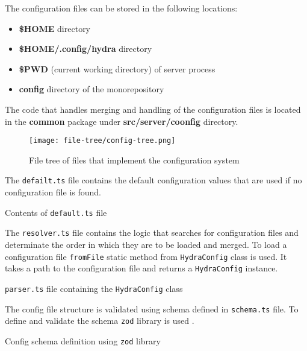 \documentclass[../main.tex]{subfiles}
\begin{document}
The configuration files can be stored in the following locations:
\begin{itemize}
  \item \textbf{\$HOME} directory
  \item \textbf{\$HOME/.config/hydra} directory
  \item \textbf{\$PWD} (current working directory) of server process
  \item \textbf{config} directory of the monorepository
\end{itemize}

The code that handles merging and handling of the configuration files is located in the \textbf{common} package under \textbf{src/server/coonfig} directory.

\begin{figure}[H]
  \centering
  \texttt{[image: file-tree/config-tree.png]}
  \caption{File tree of files that implement the configuration system}
\end{figure}

The \texttt{defailt.ts} file contains the default configuration values that are used if no configuration file is found.

\begin{listing}[H]
  \caption{Contents of \texttt{default.ts} file}
\end{listing}

The \texttt{resolver.ts} file contains the logic that searches for configuration files and determinate the order in which they are to be loaded and merged.
To load a configuration file \texttt{fromFile} static method from \texttt{HydraConfig} class is used. It takes a path to the configuration file and returns a \texttt{HydraConfig} instance.

\begin{listing}[H]
  \caption{\texttt{parser.ts} file containing the \texttt{HydraConfig} class}
\end{listing}

The config file structure is validated using schema defined in \texttt{schema.ts} file.
To define and validate the schema \texttt{zod} library is used \cite{zod}.

\begin{listing}[H]
  \caption{Config schema definition using \texttt{zod} library}
\end{listing}
\end{document}
